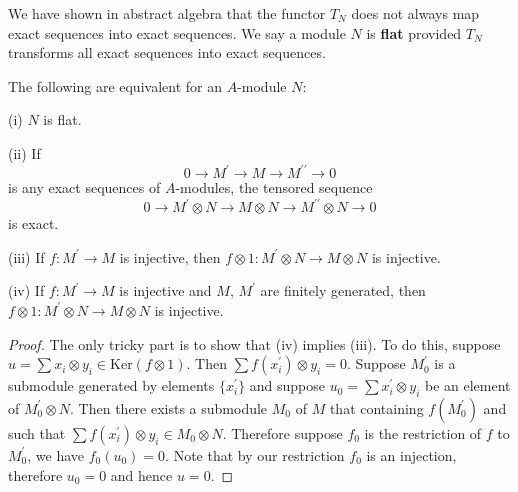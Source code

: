 We have shown in abstract algebra that the functor $T_N$ does not always map exact sequences into exact sequences. We say a module $N$ is \textbf{flat} provided $T_N$ transforms all exact sequences into exact sequences.
\begin{proposition}
The following are equivalent for an $A$-module $N$:\par
(i) $N$ is flat.\par
(ii) If 
$$0\longrightarrow M^\prime\longrightarrow M\longrightarrow M^{\prime\prime}\longrightarrow 0$$
is any exact sequences of $A$-modules, the tensored sequence 
$$
0\longrightarrow M^{\prime}\otimes N\longrightarrow M\otimes N\longrightarrow M^{\prime\prime}\otimes N\longrightarrow 0
$$
is exact.\par
(iii) If $f:M^\prime\to M$ is injective, then $f\otimes 1:M^\prime\otimes N\to M\otimes N$ is injective.\par
(iv) If $f:M^\prime\to M$ is injective and $M$, $M^\prime$ are finitely generated, then $f\otimes 1:M^\prime\otimes N\to M\otimes N$ is injective.
\end{proposition}
\begin{proof}
The only tricky part is to show that (iv) implies (iii). To do this, suppose $u=\sum x_i\otimes y_i\in\mathrm{Ker}(f\otimes 1)$. Then $\sum f(x_i^\prime)\otimes y_i=0$. Suppose $M_0^\prime$ is a submodule generated by elements $\{x_i^\prime\}$ and suppose $u_0=\sum x_i^\prime\otimes y_i$ be an element of $M_0^\prime\otimes N$. Then there exists a submodule $M_0$ of $M$ that containing $f(M_0^\prime)$ and such that $\sum f(x_i^\prime)\otimes y_i\in M_0\otimes N$. Therefore suppose $f_0$ is the restriction of $f$ to $M_0^\prime$, we have $f_0(u_0)=0$. Note that by our restriction $f_0$ is an injection, therefore $u_0=0$ and hence $u=0$.
\end{proof}